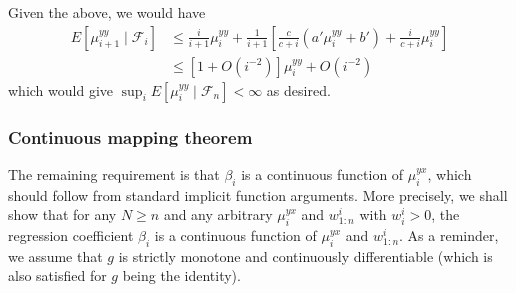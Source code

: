 \documentclass[11pt,a4paper]{article}
\theoremstyle{plain}
\theoremstyle{remark}
\theoremstyle{remark}
\begin{document}
Given the above, we would have
\begin{align*}
     E\left[\mu_{i+1}^{yy} \mid \mathcal{F}_{i}\right] &\leq \frac{i}{i+1} \mu_{i}^{yy} + \frac{1}{i+1}\left[\frac{c}{c+i}\left(a'\mu_i^{yy} + b'\right) + \frac{i}{c+i} \mu_i^{yy}\right]\\
     &\leq \left[1 + O(i^{-2})\right]\mu_i^{yy} + O(i^{-2})
\end{align*}
which would give $\sup_i E[\mu_{i}^{yy} \mid \mathcal{F}_n] < \infty$ as desired.



\subsubsection{Continuous mapping theorem}
The remaining requirement is that $\beta_i$ is a continuous function of $\mu_i^{yx}$, which should follow from standard implicit function arguments. More precisely, we shall show that for any $N\geq n$ and any arbitrary $\mu^{yx}_i$ and $w_{1:n}^i$ with $w^i_i>0$, the regression coefficient $\beta_i$ is a continuous function of $\mu^{yx}_i$ and $w_{1:n}^i$.  As a reminder, we assume that $g$ is strictly monotone and continuously differentiable (which is also satisfied for $g$ being the identity). 
\end{document}
